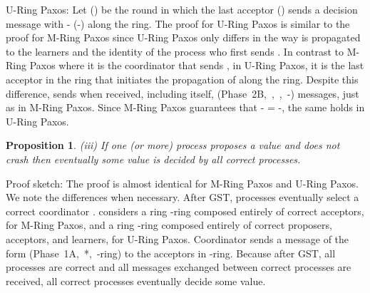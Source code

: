 \documentclass[final,3p,times,twocolumn,authoryear]{elsarticle}
\newtheorem{props}{Proposition}
\begin{document}
U-Ring Paxos: Let  () be the round in which the last acceptor  () sends a decision message  with - (-) along the ring.
The proof for U-Ring Paxos is similar to the proof for M-Ring Paxos since U-Ring Paxos only differs in the way  is propagated to the learners and the identity of the process who first sends . In contrast to M-Ring Paxos where it is the coordinator that sends , in U-Ring Paxos, it is the last acceptor in the ring  that initiates the propagation of  along the ring. Despite this difference,  sends  when  received, including itself,  (Phase~2B,~,~,~-) messages, just as in M-Ring Paxos. Since M-Ring Paxos guarantees that - = -, the same holds in U-Ring Paxos.
\vspace{1mm}
\begin{props}
(iii)  If one (or more) process proposes a value and does not crash then eventually some value is decided by all correct processes.
\end{props}
\vspace{1mm}
\noindent Proof sketch: The proof is almost identical for M-Ring Paxos and U-Ring Paxos. We note the differences when necessary. After GST, processes eventually select a correct coordinator .  considers a ring -ring composed entirely of correct acceptors, for M-Ring Paxos, and a ring -ring composed entirely of correct proposers, acceptors, and learners, for U-Ring Paxos. Coordinator  sends a message of the form (Phase~1A,~*,~-ring) to the acceptors in -ring. Because after GST, all processes are correct and all messages exchanged between correct processes are received, all correct processes eventually decide some value.
 
\end{document}
